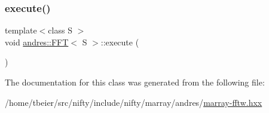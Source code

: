 \subsubsection{\texorpdfstring{execute()}{execute()}}
{\footnotesize\ttfamily template$<$class S $>$ \\
void \hyperlink{classandres_1_1FFT}{andres\+::\+F\+FT}$<$ S $>$\+::execute (\begin{DoxyParamCaption}{ }\end{DoxyParamCaption})\hspace{0.3cm}{\ttfamily [inline]}}



The documentation for this class was generated from the following file\+:\begin{DoxyCompactItemize}
\item 
/home/tbeier/src/nifty/include/nifty/marray/andres/\hyperlink{marray-fftw_8hxx}{marray-\/fftw.\+hxx}\end{DoxyCompactItemize}
